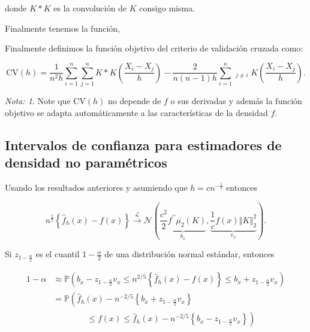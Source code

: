 \documentclass[
  12pt,
]{book}
\theoremstyle{definition}
\theoremstyle{definition}
\theoremstyle{definition}
\theoremstyle{definition}
\theoremstyle{remark}
\newtheorem*{remark}{Nota: }
\begin{document}
donde \(K*K\) es la convolución de \(K\) consigo misma.

Finalmente tenemos la función,

Finalmente definimos la función objetivo del criterio de validación cruzada como:

\[
\mathrm{CV}(h)=\frac{1}{n^{2}h}\sum_{i=1}^{n}\sum_{j=1}^{n}K*K\left(\frac{X_{i}-X_{j}}{h}\right)-\frac{2}{n(n-1)h}\sum_{i=1}^{n}\mathop{\sum_{j=1}^{n}}_{j\neq i}K\left( \frac{X_{i}-X_{j}}{h} \right).
\]

\begin{remark}
Note que \(\mathrm{CV}(h)\) no depende de \(f\) o sus derivadas y además la función objetivo se adapta automáticamente a las características de la densidad \(f\).
\end{remark}

\hypertarget{intervalos-de-confianza-para-estimadores-de-densidad-no-paramuxe9tricos}{%
\subsection{Intervalos de confianza para estimadores de densidad no paramétricos}\label{intervalos-de-confianza-para-estimadores-de-densidad-no-paramuxe9tricos}}

Usando los resultados anteriores y asumiendo que \(h=cn^{-\frac{1}{5}}\)
entonces

\begin{equation*}
n^{\frac{2}{5}} \left\{ \hat{f}_{h}(x) -f(x)\right\}
\xrightarrow{\mathcal{L}} \mathcal{N}\left(\underbrace{\frac{c^{2}}{2} f^{\prime\prime}
\mu_{2}(K)}_{b_{x}}, \underbrace{\frac{1}{c}f(x) \left\Vert K \right\Vert_{2}^{2}}_{v_{x}}\right).
\end{equation*}

Si \(z_{1-\frac{\alpha}{2}}\) es el cuantil \(1-\frac{\alpha}{2}\) de una
distribución normal estándar, entonces

\begin{align*}
1-\alpha
& \approx \mathbb{P}\left(b_{x}-z_{1-\frac{\alpha}{2}} v_{x} \leq n^{2 / 5}\left\{\widehat{f}_{h}(x)-f(x)\right\} \leq b_{x}+z_{1-\frac{\alpha}{2}} v_{x}\right) \\
& =\mathbb{P}\left(\widehat{f}_{h}(x)-n^{-2 / 5}\left\{b_{x}+z_{1-\frac{\alpha}{2}} v_{x}\right\}\right.                                                         \\
& \qquad\qquad \left. \leq f(x)\leq \hat{f}_{h}(x)-n^{-2 / 5}\left\{b_{x}-z_{1-\frac{\alpha}{2}} v_{x}\right\}\right)
\end{align*}
\end{document}
